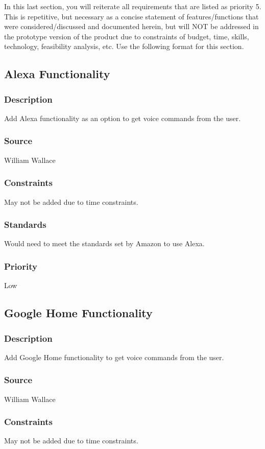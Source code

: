 In this last section, you will reiterate all requirements that are listed as priority 5. This is repetitive, but necessary as a concise statement of features/functions that were considered/discussed and documented herein, but will NOT be addressed in the prototype version of the product due to constraints of budget, time, skills, technology, feasibility analysis, etc. Use the following format for this section.

\subsection{Alexa Functionality}
\subsubsection{Description}
Add Alexa functionality as an option to get voice commands from the user.
\subsubsection{Source}
William Wallace
\subsubsection{Constraints}
May not be added due to time constraints.
\subsubsection{Standards}
Would need to meet the standards set by Amazon to use Alexa.
\subsubsection{Priority}
Low
\subsection{Google Home Functionality}
\subsubsection{Description}
Add Google Home functionality to get voice commands from the user. 
\subsubsection{Source}
William Wallace
\subsubsection{Constraints}
May not be added due to time constraints.
